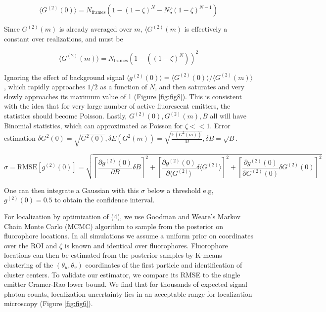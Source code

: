 \begin{equation}
\langle G^{(2)}(0)\rangle = N_{\mathrm{frames}}(1 - (1-\zeta)^N - N\zeta (1-\zeta)^{N-1})
\end{equation}

Since $G^{(2)}(m)$ is already averaged over $m$, $\langle G^{(2)}(m) $ is effectively a constant over realizations, and must be

\begin{equation}
\langle G^{(2)}(m)\rangle =  N_{\mathrm{frames}} \left(1 - \left((1-\zeta)^N\right)\right)^2
\end{equation}

Ignoring the effect of background signal $\langle g^{(2)}(0)\rangle =\langle G^{(2)}(0)\rangle/\langle G^{(2)}(m)\rangle$, which rapidly approaches $1/2$ as a function of $N$, and then saturates and very slowly approaches its maximum value of 1 (Figure \ref{fig:fig8}). This is consistent with the idea that for very large number of active fluorescent emitters, the statistics should become Poisson. Lastly, $G^{(2)}(0),G^{(2)}(m),B$ all will have Binomial statistics, which can approximated as Poisson for $\zeta << 1$. Error estimation $\delta G^2(0) = \sqrt{G^2(0)}, \delta E(G^2(m)) = \sqrt{\frac{\mathbb{E}(G^2(m))}{M}}, \delta B = \sqrt{B}$.

\begin{equation}
\sigma = \text{RMSE}[g^{(2)}(0)] = \sqrt{
    \left[
    \frac{\partial g^{(2)}(0)}{\partial B} \delta B
    \right]^2 +
    \left[
    \frac{\partial g^{(2)}(0)}{\partial \langle G^{(2)} \rangle} \delta \langle G^{(2)} \rangle
    \right]^2 +
    \left[
    \frac{\partial g^{(2)}(0)}{\partial G^{(2)}(0)} \delta G^{(2)}(0)
    \right]^2
}
\end{equation}

One can then integrate a Gaussian with this $\sigma$ below a threshold e.g, $g^{(2)}(0)=0.5$ to obtain the confidence interval.

For localization by optimization of (4), we use Goodman and Weare's Markov Chain Monte Carlo (MCMC) algorithm \parencite{Goodman2010} to sample from the posterior on fluorophore locations. In all simulations we assume a uniform prior on coordinates over the ROI and $\zeta$ is known and identical over fluorophores. Fluorophore locations can then be estimated from the posterior samples by K-means clustering of the $(\theta_u,\theta_v)$ coordinates of the first particle and identification of cluster centers. To validate our estimator, we compare its RMSE to the single emitter Cramer-Rao lower bound. We find that for thousands of expected signal photon counts, localization uncertainty lies in an acceptable range for localization microscopy (Figure \ref{fig:fig6}).


